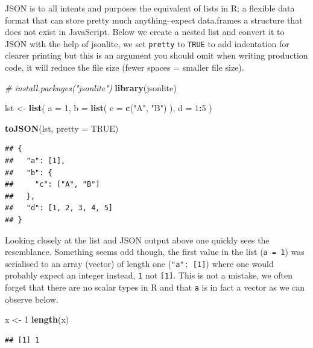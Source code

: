 \documentclass[
]{krantz}
\makeatletter
\newenvironment{Shaded}{\begin{snugshade}}{\end{snugshade}}
\newcommand{\CommentTok}[1]{\textcolor[rgb]{0.37,0.37,0.37}{\textit{#1}}}
\newcommand{\DataTypeTok}[1]{\textcolor[rgb]{0.27,0.27,0.27}{#1}}
\newcommand{\DecValTok}[1]{\textcolor[rgb]{0.06,0.06,0.06}{#1}}
\newcommand{\KeywordTok}[1]{\textcolor[rgb]{0.27,0.27,0.27}{\textbf{#1}}}
\newcommand{\NormalTok}[1]{#1}
\newcommand{\OperatorTok}[1]{\textcolor[rgb]{0.43,0.43,0.43}{\textbf{#1}}}
\newcommand{\OtherTok}[1]{\textcolor[rgb]{0.37,0.37,0.37}{#1}}
\newcommand{\StringTok}[1]{\textcolor[rgb]{0.5,0.5,0.5}{#1}}
\newenvironment{kframe}{%
\medskip{}
\setlength{\fboxsep}{.8em}
 \def\at@end@of@kframe{}%
 \ifinner\ifhmode%
  \def\at@end@of@kframe{\end{minipage}}%
  \begin{minipage}{\columnwidth}%
 \fi\fi%
 \def\FrameCommand##1{\hskip\@totalleftmargin \hskip-\fboxsep
 \colorbox{shadecolor}{##1}\hskip-\fboxsep
     \hskip-\linewidth \hskip-\@totalleftmargin \hskip\columnwidth}%
 \MakeFramed {\advance\hsize-\width
   \@totalleftmargin\z@ \linewidth\hsize
   \@setminipage}}%
 {\par\unskip\endMakeFramed%
 \at@end@of@kframe}
\renewenvironment{Shaded}{\begin{kframe}}{\end{kframe}}
\makeatother
\begin{document}
JSON is to all intents and purposes the equivalent of lists in R; a flexible data format that can store pretty much anything--expect data.frames a structure that does not exist in JavaScript. Below we create a nested list and convert it to JSON with the help of jsonlite, we set \texttt{pretty} to \texttt{TRUE} to add indentation for clearer printing but this is an argument you should omit when writing production code, it will reduce the file size (fewer spaces = smaller file size).

\begin{Shaded}
\begin{Highlighting}[]
\CommentTok{\# install.packages("jsonlite")}
\KeywordTok{library}\NormalTok{(jsonlite)}

\NormalTok{lst <{-}}\StringTok{ }\KeywordTok{list}\NormalTok{(}
  \DataTypeTok{a =} \DecValTok{1}\NormalTok{,}
  \DataTypeTok{b =} \KeywordTok{list}\NormalTok{(}
    \DataTypeTok{c =} \KeywordTok{c}\NormalTok{(}\StringTok{"A"}\NormalTok{, }\StringTok{"B"}\NormalTok{)}
\NormalTok{  ),}
  \DataTypeTok{d =} \DecValTok{1}\OperatorTok{:}\DecValTok{5}
\NormalTok{)}

\KeywordTok{toJSON}\NormalTok{(lst, }\DataTypeTok{pretty =} \OtherTok{TRUE}\NormalTok{)}
\end{Highlighting}
\end{Shaded}

\begin{verbatim}
## {
##   "a": [1],
##   "b": {
##     "c": ["A", "B"]
##   },
##   "d": [1, 2, 3, 4, 5]
## }
\end{verbatim}

Looking closely at the list and JSON output above one quickly sees the resemblance. Something seems odd though, the first value in the list (\texttt{a\ =\ 1}) was serialised to an array (vector) of length one (\texttt{"a":\ {[}1{]}}) where one would probably expect an integer instead, \texttt{1} not \texttt{{[}1{]}}. This is not a mistake, we often forget that there are no scalar types in R and that \texttt{a} is in fact a vector as we can observe below.

\begin{Shaded}
\begin{Highlighting}[]
\NormalTok{x <{-}}\StringTok{ }\DecValTok{1}
\KeywordTok{length}\NormalTok{(x)}
\end{Highlighting}
\end{Shaded}

\begin{verbatim}
## [1] 1
\end{verbatim}
\end{document}
